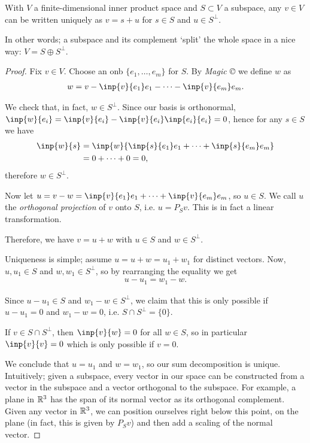 \begin{theorem}
  With $V$ a finite-dimensional inner product space and $S\subset V$ a subspace, any $v\in V$ can be written uniquely as $v = s + u$ for $s\in S$ and $u\in S^\perp$.

  In other words; a subspace and its complement `split' the whole space in a nice way: $V = S \oplus S^\perp$.
\end{theorem}
\begin{proof}
  Fix $v\in V$. Choose an onb $\{e_1,\dots,e_m\}$ for $S$. By \emph{Magic \copyright} we define $w$ as
  \begin{align*}
    w = v - \inp{v}{e_1}e_1 - \cdots - \inp{v}{e_m}e_m.
  \end{align*}

  We check that, in fact, $w\in S^\perp$. Since our basis is orthonormal,
  $\inp{w}{e_i} = \inp{v}{e_i} -  \inp{v}{e_i}\inp{e_i}{e_i} = 0$, hence for any $s\in S$ we have
  \begin{align*}
    \inp{w}{s} &= \inp{w}{\inp{s}{e_1}e_1 + \cdots + \inp{s}{e_m}e_m}\\
    &= 0 + \cdots + 0 = 0,
  \end{align*}
  therefore $w\in S^\perp$.

  Now let $u=v-w=\inp{v}{e_1}e_1 + \cdots + \inp{v}{e_m}e_m$, so $u\in S$. We call $u$ the \emph{orthogonal projection} of $v$ onto $S$, i.e. $u=P_Sv$. This is in fact a linear transformation.

  Therefore, we have $v=u+w$ with $u\in S$ and $w\in S^\perp$.

  Uniqueness is simple; assume $u=u+w=u_1+w_1$ for distinct vectors. Now, $u,u_1\in S$ and $w,w_1\in S^\perp$, so by rearranging the equality we get
  \begin{align*}
    u-u_1 = w_1-w.
  \end{align*}

  Since $u-u_1\in S$ and $w_1-w\in S^\perp$, we claim that this is only possible if $u-u_1=0$ and $w_1-w=0$, i.e. $S\cap S^\perp = \{0\}$.

  If $v\in S\cap S^\perp$, then $\inp{v}{w}=0$ for all $w\in S$, so in particular $\inp{v}{v}=0$ which is only possible if $v=0$.

  We conclude that $u=u_1$ and $w=w_1$, so our sum decomposition is unique. Intuitively; given a subspace, every vector in our space can be constructed from a vector in the subspace and a vector orthogonal to the subspace. For example, a plane in $\mathbb{R}^3$ has the span of its normal vector as its orthogonal complement. Given any vector in $\mathbb{R}^3$, we can position ourselves right below this point, on the plane (in fact, this is given by $P_Sv$) and then add a scaling of the normal vector.

\end{proof}


